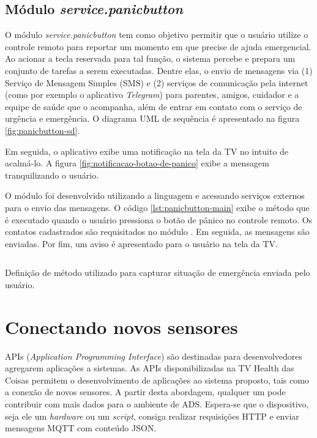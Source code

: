 \subsection{Módulo \textit{service.panicbutton}}\label{subsubsec:panicbutton}

O módulo \textit{service.panicbutton} tem como objetivo permitir que o usuário
utilize o controle remoto para reportar um momento em que precise de ajuda 
emergencial. Ao acionar a tecla reservada para tal função, o sistema percebe e
prepara um conjunto de tarefas a serem executadas. Dentre elas, o envio de 
mensagens via (1) Serviço de Mensagem Simples (SMS) e (2) serviços de comunicação
pela internet (como por exemplo o aplicativo \textit{Telegram}) para parentes, 
amigos, cuidador e a equipe de saúde que o acompanha, além de entrar em contato
com o serviço de urgência e emergência. O diagrama UML de sequência é apresentado
na figura \ref{fig:panicbutton-sd}.


Em seguida, o aplicativo exibe uma notificação na tela da TV no intuito
de acalmá-lo. A figura \ref{fig:notificacao-botao-de-panico} exibe a mensagem 
tranquilizando o usuário.

O módulo foi desenvolvido utilizando a linguagem \python[] e acessando serviços
externos para o envio das mensagens. O código \ref{lst:panicbutton-main} exibe
o método que é executado quando o usuário pressiona o botão de pânico no controle
remoto. Os contatos cadastrados são requisitados no módulo \web. Em seguida, as
mensagens são enviadas. Por fim, um aviso é apresentado para o usuário na tela
da TV.

\begin{listing}[ht!]
\inputminted{python}{codigos/panicbutton-main.py}
\caption{Definição de método utilizado para capturar situação de emergência enviada
pelo usuário.}
\label{lst:panicbutton-main}
\end{listing}

\section{Conectando novos sensores} \label{sec:conectando-novos-sensores}

APIs (\textit{Application Programming Interface}) são destinadas para desenvolvedores 
agregarem aplicações a sistemas. As APIs disponibilizadas na TV Health das Coisas 
permitem o desenvolvimento de aplicações ao sistema proposto, tais como a conexão
de novos sensores. A partir desta abordagem, qualquer um pode contribuir  com
mais dados para o ambiente de ADS. Espera-se que o
dispositivo, seja ele um \textit{hardware} ou um \textit{script}, consiga
realizar requisições HTTP e enviar mensagens MQTT com conteúdo JSON.

